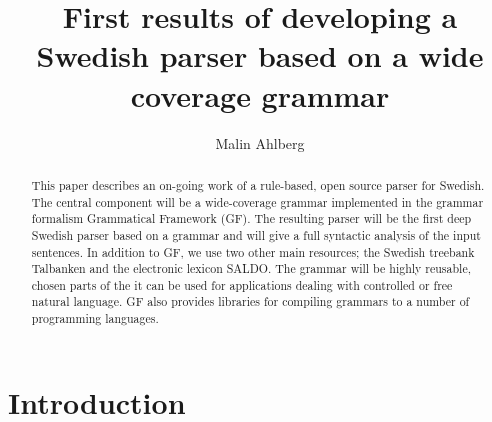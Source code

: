 \documentclass[submission]{eptcs} %
\title{First results of developing a Swedish parser based on a wide coverage grammar} %
\author{Malin Ahlberg
\institute{Center of Language Technology, Gothenburg University, Sweden}
}
\begin{document}
\maketitle

\begin{abstract}
This paper describes an on-going work of a rule-based, open source
parser for Swedish. The central component will be a wide-coverage grammar
implemented in the grammar formalism Grammatical Framework (GF). The
resulting parser will be the first deep Swedish parser based on a grammar and
will give a full syntactic analysis of the input sentences.
In addition to GF, we use two other main resources; the Swedish
treebank Talbanken and the electronic lexicon SALDO.
The grammar will be highly reusable, chosen 
parts of the it can be used for applications dealing with controlled 
or free natural language. GF also provides libraries for compiling
grammars to a number of programming languages.
% 



\end{abstract}

\section{Introduction}

\end{document}
